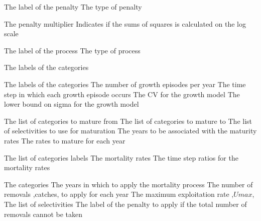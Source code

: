 \par\par
{} {The label of the penalty}
 {The type of penalty}
\par\textbf{}\par
{} {The penalty multiplier}
 {Indicates if the sums of squares is calculated on the log scale}
\par\par
{} {The label of the process}
 {The type of process}
\par\textbf{}\par
{} {The labels of the categories}
\par\textbf{}\par
{} {The labels of the categories}
 {The number of growth episodes per year}
 {The time step in which each growth episode occurs}
 {The CV for the growth model}
 {The lower bound on sigma for the growth model}
\par\textbf{}\par
{} {The list of categories to mature from}
 {The list of categories to mature to}
 {The list of selectivities to use for maturation}
 {The years to be associated with the maturity rates}
 {The rates to mature for each year}
\par\textbf{}\par
{} {The list of categories labels}
 {The mortality rates}
 {The time step ratios for the mortality rates}
\par\textbf{}\par
{} {The categories}
 {The years in which to apply the mortality process}
 {The number of removals ,catches, to apply for each year}
 {The maximum exploitation rate ,$Umax$,}
 {The list of selectivities}
 {The label of the penalty to apply if the total number of removals cannot be taken}
